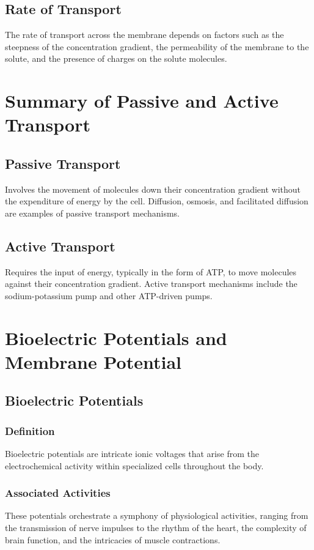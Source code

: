 \documentclass{article}
\begin{document}
\subsection{Rate of Transport}
The rate of transport across the membrane depends on factors such as the steepness of the concentration gradient, the permeability of the membrane to the solute, and the presence of charges on the solute molecules.

\section{Summary of Passive and Active Transport}

\subsection{Passive Transport}
Involves the movement of molecules down their concentration gradient without the expenditure of energy by the cell. Diffusion, osmosis, and facilitated diffusion are examples of passive transport mechanisms.

\subsection{Active Transport}
Requires the input of energy, typically in the form of ATP, to move molecules against their concentration gradient. Active transport mechanisms include the sodium-potassium pump and other ATP-driven pumps.

\section{Bioelectric Potentials and Membrane Potential}

\subsection{Bioelectric Potentials}

\subsubsection{Definition}
Bioelectric potentials are intricate ionic voltages that arise from the electrochemical activity within specialized cells throughout the body.

\subsubsection{Associated Activities}
These potentials orchestrate a symphony of physiological activities, ranging from the transmission of nerve impulses to the rhythm of the heart, the complexity of brain function, and the intricacies of muscle contractions.
\end{document}
